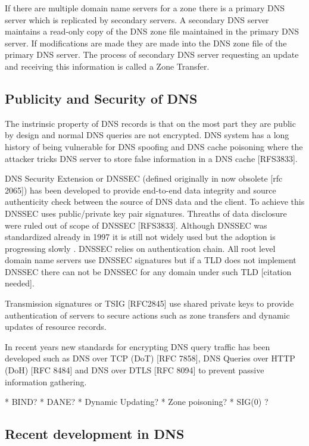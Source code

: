 If there are multiple domain name servers for a zone there is a primary DNS server which is replicated by secondary servers. A secondary DNS server maintains a read-only copy of the DNS zone file maintained in the primary DNS server. If modifications are made they are made into the DNS zone file of the primary DNS server. The process of secondary DNS server requesting an update and receiving this information is called a Zone Transfer. \citep{tanenbaum}

\subsection{Publicity and Security of DNS}
\label{sec:dns_security}

The instrinsic property of DNS records is that on the most part they are public by design and normal DNS queries are not encrypted. DNS system has a long history of being vulnerable for DNS spoofing and DNS cache poisoning where the attacker tricks DNS server to store false information in a DNS cache \cite{tanenbaum} [RFS3833]. 

DNS Security Extension or DNSSEC (defined originally in now obsolete [rfc 2065]) has been developed to provide end-to-end data integrity and source authenticity check between the source of DNS data and the client. To achieve this DNSSEC uses public/private key pair signatures. Threaths of data disclosure were ruled out of scope of DNSSEC [RFS3833]. Although DNSSEC was standardized already in 1997 it is still not widely used but the adoption is progressing slowly \cite{lotr}. DNSSEC relies on authentication chain. All root level domain name servers use DNSSEC signatures but if a TLD does not implement DNSSEC there can not be DNSSEC for any domain under such TLD [citation needed].

Transmission signatures or TSIG [RFC2845] use shared private keys to provide authentication of servers to secure actions such as zone transfers and dynamic updates of resource records.

In recent years new standards for encrypting DNS query traffic has been developed such as DNS over TCP (DoT) [RFC 7858], DNS Queries over HTTP (DoH) [RFC 8484] and DNS over DTLS [RFC 8094] to prevent passive information gathering. 

* BIND?
* DANE?
* Dynamic Updating?
* Zone poisoning?
* SIG(0) ?

\subsection{Recent development in DNS}


